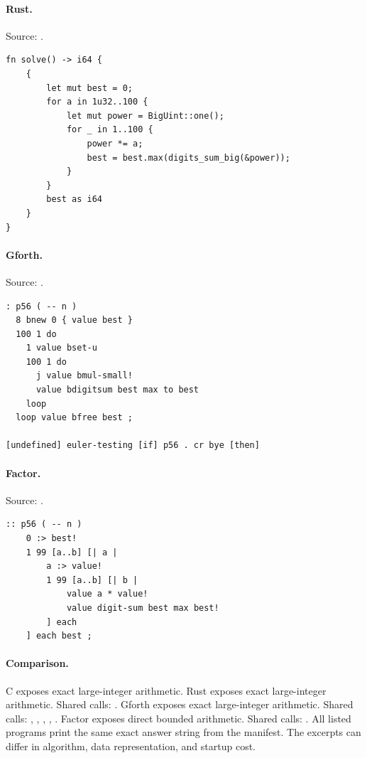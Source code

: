 \paragraph{Rust.} Source: .
\begin{lstlisting}
fn solve() -> i64 {
    {
        let mut best = 0;
        for a in 1u32..100 {
            let mut power = BigUint::one();
            for _ in 1..100 {
                power *= a;
                best = best.max(digits_sum_big(&power));
            }
        }
        best as i64
    }
}
\end{lstlisting}

\paragraph{Gforth.} Source: .
\begin{lstlisting}
: p56 ( -- n )
  8 bnew 0 { value best }
  100 1 do
    1 value bset-u
    100 1 do
      j value bmul-small!
      value bdigitsum best max to best
    loop
  loop value bfree best ;

[undefined] euler-testing [if] p56 . cr bye [then]
\end{lstlisting}

\paragraph{Factor.} Source: .
\begin{lstlisting}
:: p56 ( -- n )
    0 :> best!
    1 99 [a..b] [| a |
        a :> value!
        1 99 [a..b] [| b |
            value a * value!
            value digit-sum best max best!
        ] each
    ] each best ;
\end{lstlisting}

\paragraph{Comparison.}
C exposes exact large-integer arithmetic. Rust exposes exact large-integer arithmetic. Shared calls: \texttt{}. Gforth exposes exact large-integer arithmetic. Shared calls: \texttt{}, \texttt{}, \texttt{}, \texttt{}, \texttt{}. Factor exposes direct bounded arithmetic. Shared calls: \texttt{}.
All listed programs print the same exact answer string from the manifest. The excerpts can differ in algorithm, data representation, and startup cost.

